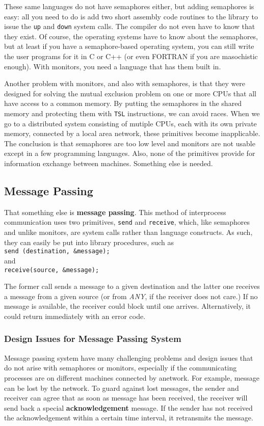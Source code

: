 \documentclass{book}
\newcommand {\kw}  [1] {\textbf{#1}}
\newcommand {\sys} [1] {\textsl{#1}}
\newcommand {\cmd} [1] {\texttt{#1}}
\begin{document}
These same languages do not have semaphores either, but adding semaphores is easy:
all you need to do is add two short assembly code routines to the library to issue the \cmd{up} and \cmd{down} system calls.
The compiler do not even have to know that they exist.
Of course, the operating systems have to know about the semaphores, 
but at least if you have a semaphore-based operating system,
you can still write the user programs for it in C or C++ (or even FORTRAN if you are masochistic enough).
With monitors, you need a language that has them built in.

Another problem with monitors, and also with semaphores, 
is that they were designed for solving the mutual exclusion problem on one or more CPUs that all have access to a common memory.
By putting the semaphores in the shared memory and protecting them with \cmd{TSL} instructions,
we can avoid races.
When we go to a distributed system consisting of mutiple CPUs, 
each with its own private memory, connected by a local area network, these primitives become inapplicable.
The conclusion is that semaphores are too low level and monitors are not usable except in a few programming languages.
Also, none of the primitives provide for information exchange between machines.
Something else is needed.

\subsection{Message Passing}
That something else is \kw{message passing}.
This method of interprocess communication uses two primitives, \cmd{send} and \cmd{receive},
which, like semaphores and unlike monitors, are system calls rather than language constructs.
As such, they can easily be put into library procedures, such as\\
\cmd{send (destination, \&message);}\\
and\\
\cmd{receive(source, \&message);}

The former call sends a message to a given destination and the latter one receives a message from a given source
(or from \sys{ANY}, if the receiver does not care.)
If no message is available, the receiver could block until one arrives.
Alternatively, it could return immediately with an error code.

\subsubsection*{Design Issues for Message Passing System}
Message passing system have many challenging problems and design issues that do not arise with semaphores or monitors,
especially if the communicating processes are on different machines connected by anetwork.
For example, message can be lost by the network.
To guard against lost messages, the sender and receiver can agree that as soon as message has been received, 
the receiver will send back a special \kw{acknowledgement} message.
If the sender has not received the acknowledgement within a certain time interval, it retransmits the message.
\end{document}
